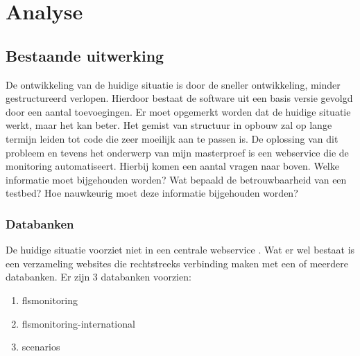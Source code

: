\newpage
\chapter{Analyse}

\section{Bestaande uitwerking}
\npar
De ontwikkeling van de huidige situatie is door de sneller ontwikkeling, minder gestructureerd verlopen.
Hierdoor bestaat de software uit een basis versie gevolgd door een aantal  toevoegingen. Er moet opgemerkt worden dat de huidige situatie werkt, maar het kan beter. Het gemist van structuur in opbouw zal op lange termijn leiden tot code die zeer moeilijk aan te passen is.
\npar
De oplossing van dit probleem en tevens het onderwerp van mijn masterproef is een webservice die de monitoring automatiseert. Hierbij komen een aantal vragen naar boven. Welke informatie moet bijgehouden worden? 
Wat bepaald de betrouwbaarheid van een testbed? Hoe nauwkeurig moet deze informatie bijgehouden worden? 

\subsection{Databanken}
\npar
De huidige situatie voorziet niet in een centrale webservice \citep{FED4FIRE-doc}.
Wat er wel bestaat is een verzameling websites die rechtstreeks verbinding maken met een of meerdere databanken. Er zijn 3 databanken voorzien:
\begin{enumerate}
\item flsmonitoring
\item flsmonitoring-international
\item scenarios
\end{enumerate}
\newpage
